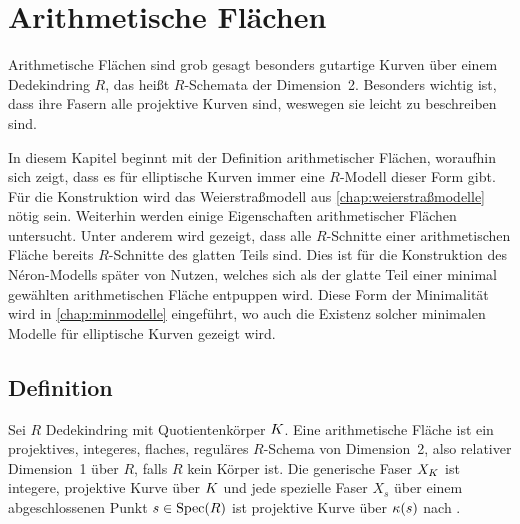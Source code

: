 \chapter{Arithmetische Flächen}\label{chap:arithmetischeflächen}
Arithmetische Flächen sind grob gesagt besonders gutartige Kurven über
einem Dedekindring $R$, das heißt $R$-Schemata der Dimension~2.
Besonders wichtig ist, dass ihre Fasern alle projektive Kurven sind,
weswegen sie leicht zu beschreiben sind.

In diesem Kapitel beginnt mit der Definition arithmetischer Flächen,
woraufhin sich zeigt, dass es für elliptische Kurven immer eine
$R$-Modell dieser Form gibt. Für die Konstruktion wird das Weierstraßmodell
aus \autoref{chap:weierstraßmodelle} nötig sein.
Weiterhin werden einige Eigenschaften arithmetischer Flächen
untersucht. Unter anderem wird gezeigt, dass alle $R$-Schnitte einer
arithmetischen Fläche bereits $R$-Schnitte des glatten Teils
sind. Dies ist für die Konstruktion des Néron-Modells später von
Nutzen, welches sich als der glatte Teil einer minimal gewählten
arithmetischen Fläche entpuppen wird.
Diese Form der Minimalität wird in \autoref{chap:minmodelle}
eingeführt, wo auch die Existenz solcher minimalen Modelle für
elliptische Kurven gezeigt wird.

\section{Definition}
\begin{Definition}
  Sei $R$ Dedekindring mit Quotientenkörper $K$.
  Eine arithmetische Fläche ist ein projektives, integeres, flaches,
  reguläres $R$-Schema von Dimension~2, also relativer Dimension~1 über
  $R$, falls $R$ kein Körper ist.
  Die generische Faser $X_{K}$ ist integere, projektive Kurve über $K$
  und jede spezielle Faser $X_s$ über einem abgeschlossenen Punkt
  $s\in\operatorname{Spec}(R)$ ist projektive Kurve über $\kappa(s)$ nach \cite[Lemma
  8.3.3]{liu}.
\end{Definition}

